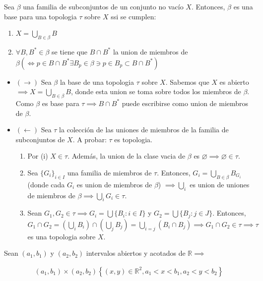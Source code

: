 \begin{teorema}
    Sea $\beta$ una familia de subconjuntos de un conjunto no vacío $X$. Entonces, $\beta$ es una base para una topologia $\tau$ sobre $X$ ssi se cumplen: 
    \begin{enumerate}
        \item $X=\bigcup_{B\in\beta}B$
        \item $\forall B,B^*\in \beta$ se tiene que $B\cap B^*$ la union de miembros de $\beta(\iff p\in B\cap B^*\exists B_p\in \beta \ni p\in B_p\subset B\cap B^*)$
    \end{enumerate}
    \begin{dem}
        \begin{itemize}
            \item $(\to)$ Sea $\beta$ la base de una topologia $\tau$ sobre $X$. Sabemos que $X$ es abierto $\implies X=\bigcup_{B\in \beta}B$, donde esta union se toma sobre todos los miembros de $\beta$. Como $\beta$ es base para $\tau\implies B\cap B^*$ puede escribirse como union de miembros de $\beta$. 
            \item $(\gets)$ Sea $\tau$ la colección de las uniones de miembros de la familia de subconjuntos de $X$. A probar: $\tau$ es topologia. 
            \begin{enumerate}
                \item Por (i) $X\in \tau$. Además, la union de la clase vacia de $\beta$ es $\varnothing\implies \varnothing\in \tau$. 
                \item Sea $\{G_i\}_{i\in I}$ una familia de miembros de $\tau$. Entonces, $G_i =\bigcup_{B\in\beta}B_{G_i}$ (donde cada $G_i$ es union de miembros de $\beta$) $\implies \bigcup_i$ es union de uniones de miembros de $\beta\implies \bigcup_i G_i\in \tau$. 
                \item Sean $G_1,G_2\in \tau\implies G_i=\bigcup\{B_i:i\in I\}$ y $G_2=\bigcup \{B_j:j\in J\}$. Entonces, $G_1\cap G_2=(\bigcup_i B_i)\cap (\bigcup_j B_j)=\bigcup_{i=j}(B_i\cap B_j)\implies G_1\cap G_2\in \tau\implies\tau$ es una topologia sobre $X$. 
            \end{enumerate}
        \end{itemize}
    \end{dem}
\end{teorema}

\begin{ejemplo}
    Sean $(a_1,b_1)$ y $(a_2,b_2)$ intervalos abiertos y acotados de $\mathbb{R}\implies$

    \begin{align}
        (a_1,b_1)\times (a_2,b_2)\left\{(x,y)\in \mathbb{R}^2,a_1<x<b_1,a_2<y<b_2\right\}
    \end{align}
\end{ejemplo}

